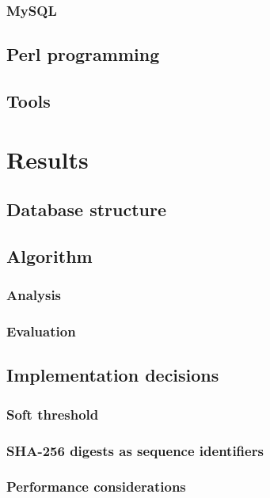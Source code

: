\documentclass[a4paper,12pt]{scrreprt}
\begin{document}
		\subsection{MySQL}
			
	\section{Perl programming}
		
	\section{Tools}
		

\chapter{Results}
	
	\section{Database structure}
		
	\section{Algorithm}
		
		\subsection{Analysis}
			
		\subsection{Evaluation}
			
	\section{Implementation decisions}
		\subsection{Soft threshold}
			
		\subsection{SHA-256 digests as sequence identifiers}
			
		\subsection{Performance considerations}
\end{document}
